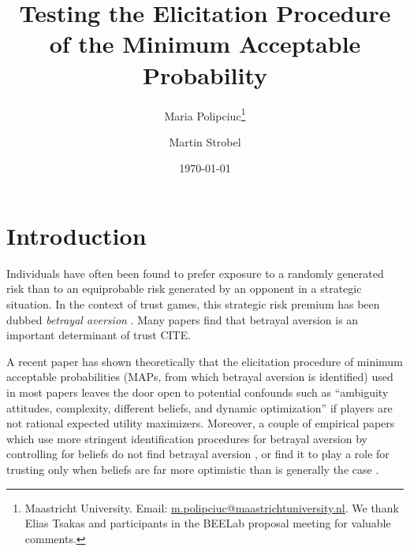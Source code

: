 
\title{Testing the Elicitation Procedure \\ of the Minimum Acceptable Probability}
\author{Maria Polipciuc\thanks{Maastricht University. Email: \url{m.polipciuc@maastrichtuniversity.nl}. We thank Elias Tsakas and participants in the BEELab proposal meeting for valuable comments.} \and Martin Strobel\footnotemark[1]}
\date{\today	\vspace{1cm}}
\titlepage



\begin{titlepage}
\clearpage
\maketitle
\thispagestyle{empty}


\begin{abstract}

\end{abstract}
\end{titlepage}


\section{Introduction}\label{sec:intro}
Individuals have often been found to prefer exposure to a randomly generated risk than to an equiprobable risk generated by an opponent in a strategic situation.
In the context of trust games, this strategic risk premium has been dubbed \textit{betrayal aversion} \citep{Bohnet2004}.
Many papers find that betrayal aversion is an important determinant of trust CITE.

A recent paper has shown theoretically that the elicitation procedure of minimum acceptable probabilities (MAPs, from which betrayal aversion is identified) used in most papers leaves the door open to potential confounds such as ``ambiguity attitudes, complexity, different beliefs, and dynamic optimization'' \citep{Li2020a} if players are not rational expected utility maximizers.
Moreover, a couple of empirical papers which use more stringent identification procedures for betrayal aversion by controlling for beliefs do not find betrayal aversion \citep{Fetchenhauer2012,Polipciuc2020}, or find it to play a role for trusting only when beliefs are far more optimistic than is generally the case \citep{Engelmann2021}.

